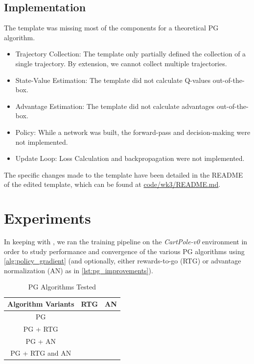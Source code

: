\documentclass{article} %
\newcommand{\cmark}{\ding{51}}%
\newcommand{\xmark}{\ding{55}}%
\begin{document}
\subsection{Implementation}
The template was missing most of the components 
for a theoretical PG algorithm.
\begin{itemize}
    \item Trajectory Collection: The template only partially defined the collection of a single trajectory.
    By extension, we cannot collect multiple trajectories.
    \item State-Value Estimation: The template did not calculate Q-values out-of-the-box.
    \item Advantage Estimation: The template did not calculate advantages out-of-the-box.
    \item Policy: While a network was built, the forward-pass and decision-making
    were not implemented.
    \item Update Loop: Loss Calculation and backpropagation were not implemented.
\end{itemize}

The specific changes made to the template have been detailed in the README
of the edited template, which can be found at \href{code/wk3/README.md}{code/wk3/README.md}.

\section{Experiments} 
In keeping with \cite{Levine-et-al-2023}, we ran the training pipeline on the \textit{CartPole-v0} environment
in order to study performance and convergence of the various PG algorithms
using \ref{alg:policy_gradient} (and optionally, either rewards-to-go (RTG) or advantage normalization (AN) as in \ref{lst:pg_improvements}).

\begin{table}[h]
    \centering
    \begin{tabular}{ccc}
        \toprule
        Algorithm Variants & RTG & AN \\
        \midrule
        PG & \xmark & \xmark \\
        PG + RTG & \cmark & \xmark \\
        PG + AN & \xmark & \cmark \\
        PG + RTG and AN & \cmark & \cmark \\
        \bottomrule
    \end{tabular}
    \caption{PG Algorithms Tested}
    \label{tab:pg_algorithms}
\end{table}
\end{document}
